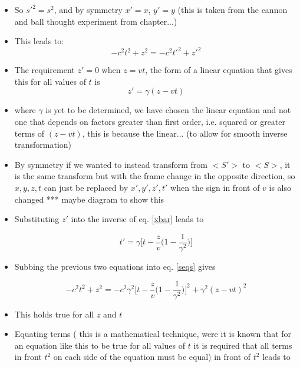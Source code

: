 \begin{itemize}
\item So $s'^2=s^2$, and by symmetry $x'=x$, $y'=y$ (this is taken from the cannon and ball thought experiment from chapter...)

\item This leads to:
\vspace{0cm}
\begin{equation}%
\label{seqs}
-c^2t^2+ z^2 = -c^2t'^2 +z'^2
\end{equation}%

\item The requirement $z'=0$ when $z=vt$, the form of a linear equation that gives this for all values of $t$ is
\vspace{0cm}
\begin{equation}%
\label{xbar}
z' = \gamma (z-vt) 
\end{equation}%
\item where $\gamma$ is yet to be determined, we have chosen the linear equation and not one that depends on factors greater than first order, i.e. squared or greater terms of $(z-vt)$, this is because the linear... (to allow for smooth inverse transformation)

\item By symmetry if we wanted to instead transform from $<S'>$ to $<S>$, it is the same transform but with the frame change in the opposite direction, so $x,y,z,t$ can just be replaced by $x',y',z',t'$ when the sign in front of $v$ is also changed *** maybe diagram to show this

\item Substituting $z'$ into the inverse of eq. \eqref{xbar} leads to

\begin{equation}%
\label{ttrans}
    t'=\gamma \bigg[t-\frac{z}{v}\bigg(1-\frac{1}{\gamma^2}\bigg)\bigg]
\end{equation}%

\item Subbing the previous two equations into eq. \eqref{seqs} gives

\begin{equation}%
    -c^2t^2+ z^2 = -c^2\gamma^2\bigg[ t -\frac{z}{v}\bigg(1-\frac{1}{\gamma^2}\bigg)\bigg]^2 + \gamma^2(z-vt)^2
\end{equation}%

\item This holds true for all $z$ and $t$ 
\item Equating terms ( this is a mathematical technique, were it is known that for an equation like this to be true for all values of $t$ it is required that all terms in front $t^2$ on each side of the equation must be equal) in front of $t^2$ leads to


\end{itemize}

